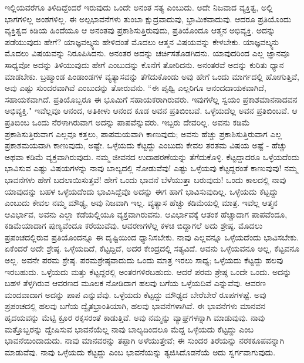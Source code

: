\newpage

ಇಲ್ಲಿಯವರೆಗೂ ತಿಳಿದಿದ್ದೆಂದರೆ ಇರುವುದು ಒಂದೇ ಅನಂತ ಸತ್ಯ ಎಂಬುದು. ಅದೇ ನಿಜವಾದ ವ್ಯಕ್ತಿತ್ವ, ಅಲ್ಲಿ ಭಾಗಗಳಿಲ್ಲ ಅಂಶಗಳಿಲ್ಲ. ಈ ಅಲ್ಪಭಾವನೆಗಳು ತುಂಬಾ ಕ್ಷುದ್ರವಾದುವು, ಭ್ರಾಮಿಕವಾದುವು. ಆದರೂ ಪ್ರತಿಯೊಂದು ವ್ಯಕ್ತಿತ್ವದ ಕಿಡಿಯ ಹಿಂದೆಯೂ ಆ ಅನಂತವು ಪ್ರಕಾಶಿಸುತ್ತಿರುವುದು, ಪ್ರತಿಯೊಂದೂ ಆತ್ಮನ ಅಭಿವ್ಯಕ್ತಿ. ಅದನ್ನು ಪಡೆಯುವುದು ಹೇಗೆ? ಯಾಜ್ಞವಲ್ಕ್ಯನು ಹೇಳಿದಂತೆ ಮೊದಲು ಆತ್ಮನ ವಿಷಯವನ್ನು ಕೇಳಬೇಕು. ಯಾಜ್ಞವಲ್ಕ್ಯನು ಮೊದಲು ವಿಷಯವನ್ನು ನಿರೂಪಿಸಿದನು. ಅನಂತರ ಅದನ್ನು ಚರ್ಚಿಸತೊಡಗಿದನು. ಯಾವುದರಿಂದ ಎಲ್ಲ ಜ್ಞಾನವೂ ಸಾಧ್ಯವೋ ಅದನ್ನು ತಿಳಿಯುವುದು ಹೇಗೆ ಎಂಬುದನ್ನು ಕೊನೆಗೆ ತೋರಿದನು. ಅನಂತರವೆ ಅದನ್ನು ಕುರಿತು ಧ್ಯಾನ ಮಾಡಬೇಕು. ಬ್ರಹ್ಮಾಂಡ ಪಿಂಡಾಂಡಗಳ ವ್ಯತ್ಯಾಸವನ್ನು ತೆಗೆದುಕೊಂಡು ಅವು ಹೇಗೆ ಒಂದು ಮಾರ್ಗದಲ್ಲಿ ಹೋಗುತ್ತಿವೆ, ಅವು ಎಷ್ಟು ಸುಂದರವಾಗಿವೆ ಎಂಬುದನ್ನು ತೋರುವನು. “ಈ ಪೃಥ್ವಿ ಎಲ್ಲರಿಗೂ ಆನಂದದಾಯಕವಾಗಿದೆ, ಸಹಾಯಕವಾಗಿದೆ. ಪ್ರತಿಯೊಬ್ಬರೂ ಈ ಭೂಮಿಗೆ ಸಹಾಯಕರಾಗಿರುವರು. ಇವುಗಳೆಲ್ಲ ಸ್ವಯಂ ಪ್ರಕಾಶಮಾನನಾದವನ ಅಭಿವ್ಯಕ್ತಿ." ಇವೆಲ್ಲವೂ ಆನಂದ, ಅತಿಕೀಳು ಆನಂದ ಕೂಡ ಅವನ ಪ್ರತಿಬಿಂಬವೆ. ಒಳ್ಳೆಯದೆಲ್ಲ ಅವನ ಪ್ರತಿಬಿಂಬವೆ. ಆ ಪ್ರತಿಬಿಂಬ ಒಂದು ನೆರಳಾಗಿರುವಾಗ ಅದನ್ನು ಪಾಪವೆನ್ನುವರು. ಇಬ್ಬರು ದೇವರಿಲ್ಲ. ಅವನು ಕಡಿಮೆ ಪ್ರಕಾಶಿಸುತ್ತಿರುವಾಗ ಎಲ್ಲವೂ ಕತ್ತಲು, ಪಾಪಮಯವಾಗಿ ಕಾಣುವುದು; ಅವನು ಹೆಚ್ಚು ಪ್ರಕಾಶಿಸುತ್ತಿರುವಾಗ ಎಲ್ಲ ಪ್ರಕಾಶಮಯವಾಗಿ ಕಾಣುವುದು, ಅಷ್ಟೇ. ಒಳ್ಳೆಯದು ಕೆಟ್ಟದ್ದು ಎಂಬುದು ಕೇವಲ ತರತಮ ವಿಷಯ ಅಷ್ಟೆ - ಹೆಚ್ಚು ಅಥವಾ ಕಡಿಮೆ ವ್ಯಕ್ತವಾಗಿರುವುದು. ನಮ್ಮ ಜೀವನದ ಉದಾಹರಣೆಯನ್ನು ತೆಗೆದುಕೊಳ್ಳಿ. ಕೆಟ್ಟದ್ದಾದರೂ ಒಳ್ಳೆಯದೆಂದು ಭಾವಿಸುವ ಎಷ್ಟು ವಿಷಯಗಳನ್ನು ನಾವು ಬಾಲ್ಯದಲ್ಲಿ ನೋಡುವೆವು! ಎಷ್ಟು ಒಳ್ಳೆಯವು ಕೆಟ್ಟದ್ದರಂತೆ ಕಾಣುವುವು! ನಮ್ಮ ಭಾವನೆಗಳು ಹೇಗೆ ಬದಲಾಯಿಸುತ್ತವೆ! ಹೇಗೆ ಒಂದು ಭಾವನೆ ಬೆಳೆಯುತ್ತಾ ಬರುವುದು! ಒಂದು ಕಾಲದಲ್ಲಿ ನಾವು ಯಾವುದನ್ನು ಬಹಳ ಒಳ್ಳೆಯದೆಂದು ಭಾವಿಸಿದ್ದೆವೊ ಅದನ್ನು ಈಗ ಹಾಗೆ ಭಾವಿಸುವುದಿಲ್ಲ. ಒಳ್ಳೆಯದು ಕೆಟ್ಟದ್ದು ಎಂಬುದು ಕೇವಲ ನಮ್ಮ ಮೌಢ್ಯ, ಅವು ನಿಜವಾಗಿ ಇಲ್ಲ. ವ್ಯತ್ಯಾಸ ಹೆಚ್ಚು ಕಡಿಮೆಯಲ್ಲಿ ಮಾತ್ರ. ಇವೆಲ್ಲ ಆತ್ಮನ ಆವಿರ್ಭಾವ, ಅವನು ಎಲ್ಲಾ ಕಡೆಯಲ್ಲಿಯೂ ವ್ಯಕ್ತವಾಗಿರುವನು. ಆವಿರ್ಭಾವಕ್ಕೆ ಆತಂಕ ಹೆಚ್ಚಾದಾಗ ಪಾಪವೆಂದೂ, ಕಡಿಮೆಯಾದಾಗ ಪುಣ್ಯವೆಂದೂ ಕರೆಯುವೆವು. ಆವರಣಗಳೆಲ್ಲ ಕಳಚಿ ಬಿದ್ದಾಗಲೆ ಅದು ಶ್ರೇಷ್ಠ. ಮೊದಲು ಪ್ರಪಂಚದಲ್ಲಿರುವ ಪ್ರತಿಯೊಂದನ್ನೂ ಈ ದೃಷ್ಟಿಯಿಂದ ಧ್ಯಾನಿಸಬೇಕು. ನಾವು ಎಲ್ಲವನ್ನೂ ಒಳ್ಳೆಯದೆಂದು ಭಾವಿಸಬೇಕು. ಏಕೆಂದರೆ ಅದೇ ಶ್ರೇಷ್ಠ. ಒಳ್ಳೆಯದಿದೆ, ಕೆಟ್ಟದ್ದಿದೆ, ಅದರ ಕೇಂದ್ರದಲ್ಲಿ ಸತ್ಯವಿದೆ. ಅವನು ಒಳ್ಳೆಯವನೂ ಅಲ್ಲ, ಕೆಟ್ಟವನೂ ಅಲ್ಲ. ಅವನೇ ಪರಮ ಶ್ರೇಷ್ಠ. ಪರಮಶ್ರೇಷ್ಠವಾದುದು ಒಂದು ಮಾತ್ರ ಇರಲು ಸಾಧ್ಯ; ಒಳ್ಳೆಯದು ಕೆಟ್ಟದ್ದು ಹಲವು ಇರಬಹುದು. ಒಳ್ಳೆಯದು ಮತ್ತು ಕೆಟ್ಟದ್ದರಲ್ಲಿ ಅಂತರಗಳಿರಬಹುದು. ಆದರೆ ಪರಮ ಶ್ರೇಷ್ಠ ಒಂದೇ ಒಂದು. ಅದನ್ನು ಬಹಳ ತೆಳ್ಳಗಿರುವ ಆವರಣದ ಮೂಲಕ ನೋಡಿದಾಗ ಹಲವು ಬಗೆಯ ಒಳ್ಳೆಯದಿವೆ ಎನ್ನುವೆವು. ಆವರಣ ಮಂದವಾದಾಗ ಅದನ್ನು ಪಾಪ ಎನ್ನುವೆವು. ಒಳ್ಳೆಯದು ಕೆಟ್ಟದ್ದು ಮೌಢ್ಯದ ಬೇರೆಬೇರೆ ರೂಪಗಳಷ್ಟೆ. ಅವು ಪ್ರಪಂಚದಲ್ಲಿ ಹಲವು ಬಗೆಯ ದ್ವೈತಭ್ರಾಂತಿಯಾಗಿ, ಹಲವು ಭಾವನೆಗಳಾಗಿವೆ. ಈ ಭಾವನೆಗಳು ಮಾನವನ ಹೃದಯವನ್ನು ಮೆಟ್ಟಿ ಕ್ರೂರ ರಕ್ಕಸರಂತೆ ಕಾಡುತ್ತಿವೆ. ಅವು ನಮ್ಮನ್ನು ವ್ಯಾಘ್ರಗಳನ್ನಾಗಿ ಮಾಡುವುವು. ನಾವು ಮತ್ತೊಬ್ಬರನ್ನು ದ್ವೇಷಿಸುವ ಭಾವನೆಯೆಲ್ಲ ನಾವು ಬಾಲ್ಯದಿಂದಲೂ ಮೆದ್ದ ಒಳ್ಳೆಯದು ಕೆಟ್ಟದ್ದು ಎಂಬ ಭಾವನೆಯಿಂದಾದುದು. ನಾವು ಮಾನವರನ್ನು ತಪ್ಪಾಗಿ ಅಳೆಯುತ್ತೇವೆ; ಈ ಸುಂದರ ತಿರೆಯನ್ನು ನರಕಕೂಪವನ್ನಾಗಿ ಮಾಡುವೆವು. ನಾವು ಒಳ್ಳೆಯದು ಕೆಟ್ಟದ್ದು ಎಂಬ ಭಾವನೆಯನ್ನು ತ್ಯಜಿಸಿದೊಡನೆಯೆ ಅದು ಸ್ವರ್ಗವಾಗುವುದು.

